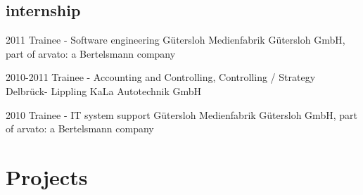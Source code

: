 \documentclass[]{friggeri-cv} %
\begin{document}
\subsection{internship}

\begin{entrylist}
	
	
	\entry
	{2011}
	{Trainee - Software engineering}
	{G\"{u}tersloh}
	{Medienfabrik G\"{u}tersloh GmbH, part of arvato: a Bertelsmann company}
	
	
	\entry
	{2010-2011}
	{Trainee - Accounting and Controlling, Controlling / Strategy}
	{Delbr\"{u}ck- Lippling}
	{KaLa Autotechnik GmbH}
	
	
	\entry
	{2010}
	{Trainee - IT system support}
	{G\"{u}tersloh}
	{Medienfabrik G\"{u}tersloh GmbH, part of arvato: a Bertelsmann company}


\end{entrylist}

\pagebreak


\section{Projects}
\end{document}
